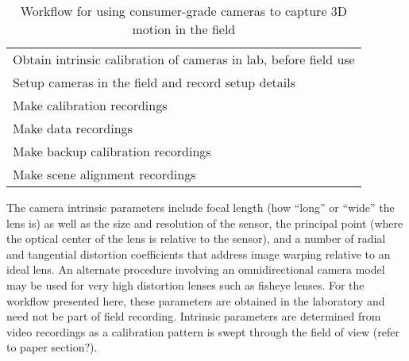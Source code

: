 \documentclass[fleqn,10pt]{wlpeerj}
\begin{document}
\begin{table}
\caption{Workflow for using consumer-grade cameras to capture 3D motion in the field}
\label{tbl:workflowsummary}
\begin{tabular}{l}
Obtain intrinsic calibration of cameras in lab, before field use\\
Setup cameras in the field and record setup details\\
Make calibration recordings\\
Make data recordings\\
Make backup calibration recordings\\
Make scene alignment recordings\\
\end{tabular}
\end{table}

The camera intrinsic parameters include focal length (how ``long'' or ``wide'' the lens is) as well as the size and resolution of the sensor, the principal point (where the optical center of the lens is relative to the sensor), and a number of radial and tangential distortion coefficients that address image warping relative to an ideal lens. An alternate procedure involving an omnidirectional camera model may be used for very high distortion lenses such as fisheye lenses.  For the workflow presented here, these parameters are obtained in the laboratory and need not be part of field recording.  Intrinsic parameters are determined from video recordings as a calibration pattern is swept through the field of view (refer to paper section?).  
\end{document}
